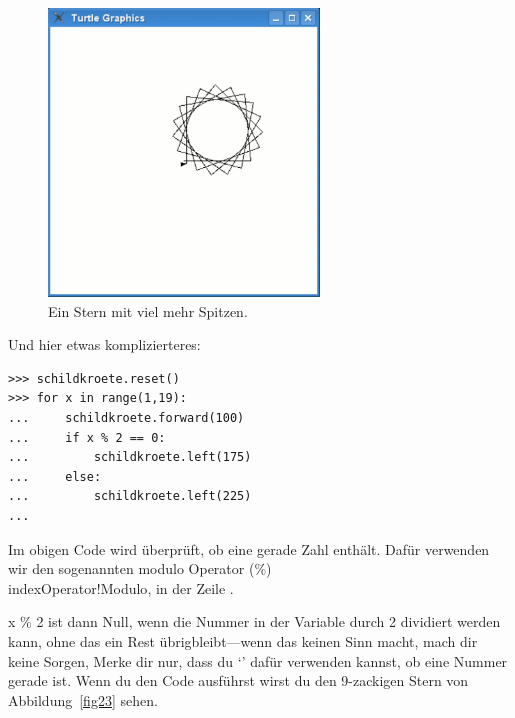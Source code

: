 \begin{figure}
\begin{center}
\includegraphics[width=72mm]{images/figure22}
\end{center}
\caption{Ein Stern mit viel mehr Spitzen.}\label{fig22}
\end{figure}

\noindent
Und hier etwas komplizierteres:

\begin{Verbatim}[frame=single]
>>> schildkroete.reset()
>>> for x in range(1,19):
...     schildkroete.forward(100)
...     if x % 2 == 0:
...         schildkroete.left(175)
...     else:
...         schildkroete.left(225)
...
\end{Verbatim}


Im obigen Code wird überprüft, ob  eine gerade Zahl enthält. Dafür verwenden wir den sogenannten modulo Operator (\%)\\ index{Operator!Modulo}, in der Zeile .
\par
x \% 2 ist dann Null, wenn die Nummer in der Variable  durch 2 dividiert werden kann, ohne das ein Rest übrigbleibt---wenn das keinen Sinn macht, mach dir keine Sorgen, Merke dir nur, dass du `' dafür verwenden kannst, ob eine Nummer gerade ist. Wenn du den Code ausführst wirst du den 9-zackigen Stern von Abbildung~\ref{fig23} sehen.

